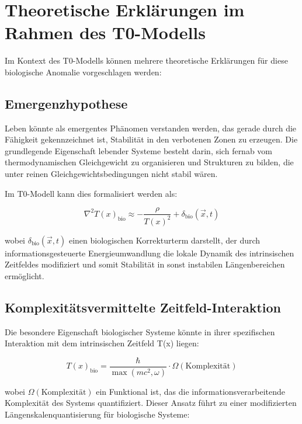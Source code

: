 \documentclass[12pt,a4paper]{article}
\newcommand{\Tfield}{T(x)}
\begin{document}
	\section{Theoretische Erklärungen im Rahmen des T0-Modells}
	\label{sec:theoretische_erklaerungen}
	
	Im Kontext des T0-Modells können mehrere theoretische Erklärungen für diese biologische Anomalie vorgeschlagen werden:
	
	\subsection{Emergenzhypothese}
	\label{subsec:emergenzhypothese}
	
	Leben könnte als emergentes Phänomen verstanden werden, das gerade durch die Fähigkeit gekennzeichnet ist, Stabilität in den \glqq verbotenen Zonen\grqq{} zu erzeugen. Die grundlegende Eigenschaft lebender Systeme besteht darin, sich fernab vom thermodynamischen Gleichgewicht zu organisieren und Strukturen zu bilden, die unter reinen Gleichgewichts\-bedingungen nicht stabil wären.
	
	Im T0-Modell kann dies formalisiert werden als:
	
	\begin{equation}
		\nabla^2\Tfield_{\text{bio}} \approx -\frac{\rho}{\Tfield^2} + \delta_{\text{bio}}(\vec{x}, t)
	\end{equation}
	
	wobei $\delta_{\text{bio}}(\vec{x}, t)$ einen biologischen Korrekturterm darstellt, der durch informationsgesteuerte Energieumwandlung die lokale Dynamik des intrinsischen Zeitfeldes modifiziert und somit Stabilität in sonst instabilen Längen\-bereichen ermöglicht.
	
	\subsection{Komplexitätsvermittelte Zeitfeld-Interaktion}
	\label{subsec:komplexitaet_interaktion}
	
	Die besondere Eigenschaft biologischer Systeme könnte in ihrer spezifischen Interaktion mit dem intrinsischen Zeitfeld \Tfield{} liegen:
	
	\begin{equation}
		\Tfield_{\text{bio}} = \frac{\hbar}{\max(mc^2, \omega)} \cdot \Omega(\text{Komplexität})
	\end{equation}
	
	wobei $\Omega(\text{Komplexität})$ ein Funktional ist, das die informationsverarbeitende Komplexität des Systems quantifiziert. Dieser Ansatz führt zu einer modifizierten Längen\-skalen\-quantisierung für biologische Systeme:
	
\end{document}
